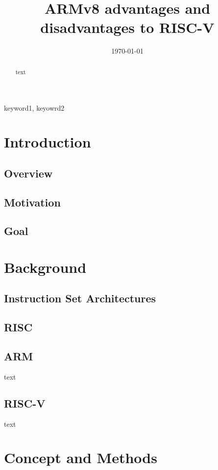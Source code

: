 \documentclass[conference]{IEEEtran}
\date{\today}
\begin{document}
\title{ARMv8 advantages and disadvantages to RISC-V}

\maketitle

\begin{abstract}
text
\end{abstract}

\begin{IEEEkeywords}
keyword1, keyowrd2
\end{IEEEkeywords}

\section{Introduction}
\label{ref:introduction}
	\subsection{Overview}
	\subsection{Motivation}
	\subsection{Goal}

\section{Background}
\label{ref:background}
	\subsection{Instruction Set Architectures}
	\subsection{RISC}
	\subsection{ARM}
	text
	\subsection{RISC-V}
	text

\section{Concept and Methods}
\label{ref:concept}
\end{document}
